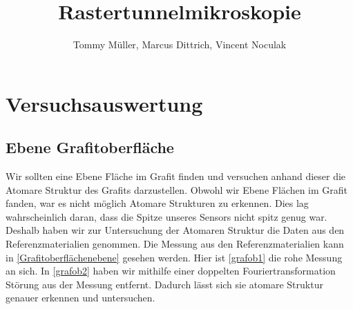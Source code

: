 \documentclass[10pt,a4paper]{article}
\author{Tommy Müller, Marcus Dittrich, Vincent Noculak}
\title{Rastertunnelmikroskopie}
\begin{document}
\maketitle
\newpage
\tableofcontents
\newpage

\section{Versuchsauswertung}

\subsection{Ebene Grafitoberfläche}

Wir sollten eine Ebene Fläche im Grafit finden und versuchen anhand dieser die Atomare Struktur des Grafits darzustellen. Obwohl wir Ebene Flächen im Grafit fanden, war es nicht möglich Atomare Strukturen zu erkennen. Dies lag wahrscheinlich daran, dass die Spitze unseres Sensors nicht spitz genug war. Deshalb haben wir zur Untersuchung der Atomaren Struktur die Daten aus den Referenzmaterialien genommen. Die Messung aus den Referenzmaterialien kann in \ref{Grafitoberflächenebene} gesehen werden. Hier ist \ref{grafob1} die rohe Messung an sich. In \ref{grafob2} haben wir mithilfe einer doppelten Fouriertransformation Störung aus der Messung entfernt. Dadurch lässt sich sie atomare Struktur genauer erkennen und untersuchen.
\end{document}
